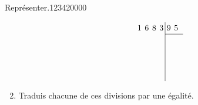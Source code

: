 \begin{pageParcoursu}
\begin{ExoCu}{Représenter.}{1234}{2}{0}{0}{0}{0}
\begin{enumerate}
\begin{minipage}{0.3\linewidth}
\end{minipage}
\begin{minipage}{0.3\linewidth}
\begin{equation*}
\renewcommand{\arraystretch}{1.2}
\renewcommand{\arraycolsep}{2pt}
  \begin{array}{rrrr|rrr}
1 & 6  & 8 & 3 & 9 & 5 \\
\cline{5-7}
 & &  &  &  & \\
    & &  &  &   &   &  \\
    &  &  &  &   &   &  \\
    &&  &  &   &   &  \\
  \end{array}
\end{equation*}
\end{minipage}


\item Traduis chacune de ces divisions par une égalité.
\end{enumerate}
\end{ExoCu}

 


\end{pageParcoursu}

  



